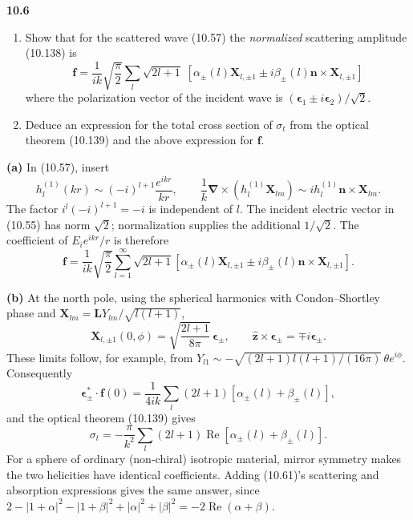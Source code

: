 \par\bigskip
\noindent\textbf{10.6}\quad\begin{enumerate}
\item[(a)] Show that for the scattered wave (10.57) the \emph{normalized} scattering amplitude (10.138) is
\[
\mathbf{f}=\frac{1}{ik}\sqrt{\frac{\pi}{2}}\sum_{l}\sqrt{2l+1}\;[\alpha_{\pm}(l)\mathbf{X}_{l,\pm1}\pm i\beta_{\pm}(l)\mathbf{n}\times\mathbf{X}_{l,\pm1}]
\]
where the polarization vector of the incident wave is $(\boldsymbol{\epsilon}_{1}\pm i\boldsymbol{\epsilon}_{2})/\sqrt{2}$.
\item[(b)] Deduce an expression for the total cross section of $\sigma_{t}$ from the optical theorem (10.139) and the above expression for $\mathbf{f}$.
\end{enumerate}
\solution
\textbf{(a)} In (10.57), insert
\[
h_l^{(1)}(kr)\sim(-i)^{l+1}\frac{e^{ikr}}{kr},\qquad
\frac1k\boldsymbol\nabla\times(h_l^{(1)}\mathbf X_{lm})
\sim i h_l^{(1)}\mathbf n\times\mathbf X_{lm}.
\]
The factor $i^l(-i)^{l+1}=-i$ is independent of $l$.
The incident electric vector in (10.55) has norm $\sqrt2$;
normalization supplies the additional $1/\sqrt2$.
The coefficient of $E_i e^{ikr}/r$ is therefore
\[
\boxed{\mathbf f=\frac1{ik}\sqrt{\frac\pi2}
\sum_{l=1}^\infty\sqrt{2l+1}
[\alpha_\pm(l)\mathbf X_{l,\pm1}
\pm i\beta_\pm(l)\mathbf n\times\mathbf X_{l,\pm1}].}
\]

\textbf{(b)} At the north pole, using the spherical harmonics with
Condon--Shortley phase and $\mathbf X_{lm}=\mathbf L Y_{lm}/\sqrt{l(l+1)}$,
\[
\mathbf X_{l,\pm1}(0,\phi)
=\sqrt{\frac{2l+1}{8\pi}}\,\boldsymbol\epsilon_\pm,\qquad
\widehat{\mathbf z}\times\boldsymbol\epsilon_\pm
=\mp i\boldsymbol\epsilon_\pm.
\]
These limits follow, for example, from
$Y_{l1}\sim-\sqrt{(2l+1)l(l+1)/(16\pi)}\,\theta e^{i\phi}$.
Consequently
\[
\boldsymbol\epsilon_\pm^*\cdot\mathbf f(0)
=\frac1{4ik}\sum_l(2l+1)[\alpha_\pm(l)+\beta_\pm(l)],
\]
and the optical theorem (10.139) gives
\[
\boxed{\sigma_t=-\frac{\pi}{k^2}
\sum_l(2l+1)\operatorname{Re}[\alpha_\pm(l)+\beta_\pm(l)].}
\]
For a sphere of ordinary (non-chiral) isotropic material, mirror
symmetry makes the two helicities have identical coefficients. Adding (10.61)'s scattering and absorption expressions
gives the same answer, since
$2-|1+\alpha|^2-|1+\beta|^2+|\alpha|^2+|\beta|^2
=-2\operatorname{Re}(\alpha+\beta)$.

